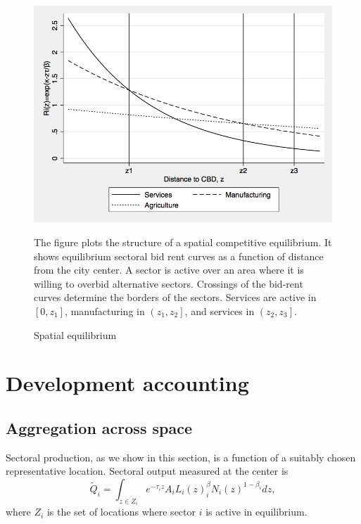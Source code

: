 \documentclass[12pt]{article}
\begin{document}
\begin{figure}[h!]
\label{fig:BidRent}
\caption{Spatial equilibrium}
\begin{center}
\includegraphics[scale=0.4]{figures/bid_rent_curves}
\end{center}

\noindent \footnotesize{The figure plots the structure of a spatial competitive equilibrium. It shows equilibrium sectoral bid rent curves as a function of distance from the city center. A sector is active over an area where it is willing to overbid alternative sectors. Crossings of the bid-rent curves determine the borders of the sectors. Services are active in $[0,z_1]$, manufacturing in $\left(z_1,z_2\right]$, and services in $\left(z_2,z_3\right]$.}
\end{figure}



\section{Development accounting}
\subsection{Aggregation across space}
Sectoral production, as we show in this section, is a function of a suitably chosen representative location. Sectoral output measured at the center is
\begin{equation*}
\tilde{Q}_i=\int_{z\in Z_i}e^{-\tau_i z}A_iL_i(z)^\beta_iN_i(z)^{1-\beta_i}dz,
\end{equation*}
where $Z_i$ is the set of locations where sector $i$ is active in equilibrium.
\end{document}
